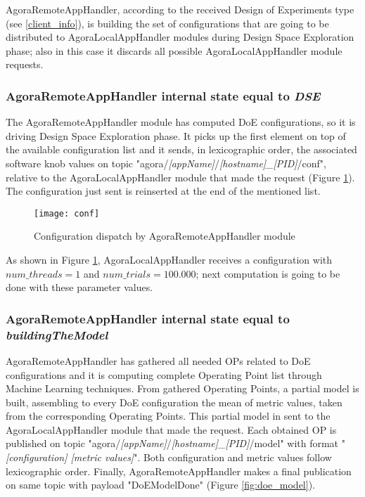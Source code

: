 AgoraRemoteAppHandler, according to the received Design of Experiments type (see \ref{client_info}), is building the set of configurations that are going to be distributed to AgoraLocalAppHandler modules during Design Space Exploration phase; also in this case it discards all possible AgoraLocalAppHandler module requests.


\subsubsection{AgoraRemoteAppHandler internal state equal to \textit{DSE}}\label{dse_conf}

The AgoraRemoteAppHandler module has computed DoE configurations, so it is driving Design Space Exploration phase. It picks up the first element on top of the available configuration list and it sends, in lexicographic order, the associated software knob values on topic "agora\slash{}\textit{[appName]}\slash{}\textit{[hostname]\_[PID]}\slash{}conf", relative to the AgoraLocalAppHandler module that made the request (Figure \ref{fig:conf}). The configuration just sent is reinserted at the end of the mentioned list.

\begin{figure}[ht]

    \centering
    \texttt{[image: conf]}
    \caption{Configuration dispatch by AgoraRemoteAppHandler module}
    \label{fig:conf}
    
\end{figure}

As shown in Figure \ref{fig:conf}, AgoraLocalAppHandler receives a configuration with $num\_threads = 1$ and $num\_trials = 100.000$; next computation is going to be done with these parameter values.


\subsubsection{AgoraRemoteAppHandler internal state equal to \textit{building\-The\-Model}}\label{DoEModelSend}

AgoraRemoteAppHandler has gathered all needed OPs related to DoE configurations and it is computing complete Operating Point list through Machine Learning techniques. From gathered Operating Points, a partial model is built, assembling to every DoE configuration the mean of metric values, taken from the corresponding Operating Points. This partial model in sent to the Agora\-Local\-App\-Handler module that made the request. Each obtained OP is published on topic "agora\slash{}\textit{[appName]}\slash{}\textit{[hostname]\_[PID]}\slash{}mod\-el" with format "\textit{[configuration] [metric values]}". Both configuration and metric values follow lexicographic order. Finally, AgoraRemoteAppHandler makes a final publication on same topic with payload "DoEModelDone" (Figure \ref{fig:doe_model}).

